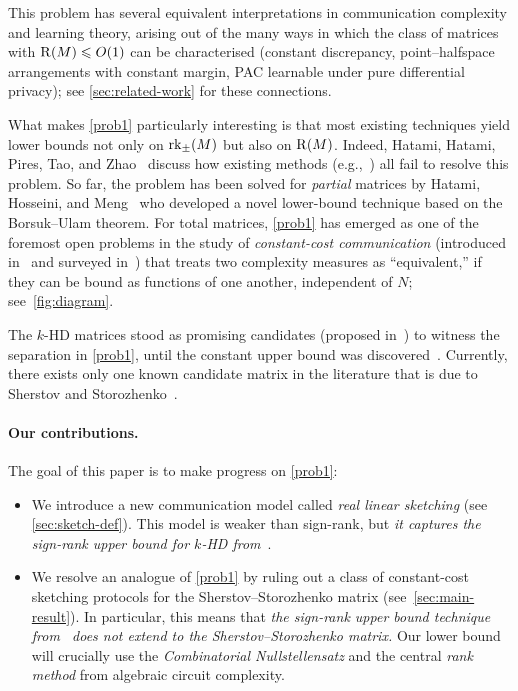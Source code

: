 \documentclass{article}
\begin{document}
This problem has several equivalent interpretations in communication complexity and learning theory, arising out of the many ways in which the class of matrices with $\operatorname{R}(M)\leqslant O(1)$ can be characterised (constant discrepancy, point--halfspace arrangements with constant margin, PAC learnable under pure differential privacy); see \cref{sec:related-work} for these connections.

What makes \cref{prob1} particularly interesting is that most existing techniques yield lower bounds not only on $\operatorname{rk}_\pm(M)$ but also on $\operatorname{R}(M)$. Indeed, Hatami, Hatami, Pires, Tao, and Zhao~\cite{HHPTZ22} discuss how existing methods (e.g.,~\cite{PS86,For02,APP+2005,AMY16}) all fail to resolve this problem. So far, the problem has been solved for \emph{partial} matrices by Hatami, Hosseini, and Meng~\cite{HHM23} who developed a novel lower-bound technique based on the Borsuk--Ulam theorem. For total matrices, \cref{prob1} has emerged as one of the foremost open problems in the study of \emph{constant-cost communication} (introduced in~\cite{HHH23,HWZ22} and surveyed in~\cite{HH24}) that treats two complexity measures as ``equivalent,'' if they can be bound as functions of one another, independent of $N$; see~\cref{fig:diagram}.

The $k$-HD matrices stood as promising candidates (proposed in~\cite{HHPTZ22,HHM23}) to witness the separation in \cref{prob1}, until the constant upper bound was discovered~\cite{GHIS25}. Currently, there exists only one known candidate matrix in the literature that is due to Sherstov and Storozhenko~\cite{SS24}.

\paragraph{Our contributions.} The goal of this paper is to make progress on \cref{prob1}:
\begin{itemize}
    \item We introduce a new communication model called \emph{real linear sketching} (see \cref{sec:sketch-def}). This model is weaker than sign-rank, but \emph{it captures the sign-rank upper bound for \textsc{$k$-HD} from}~\cite{GHIS25}.
    \item We resolve an analogue of \cref{prob1} by ruling out a class of constant-cost sketching protocols for the Sherstov--Storozhenko matrix (see~\cref{sec:main-result}). In particular, this means that \emph{the sign-rank upper bound technique from~{\upshape \cite{GHIS25}} does not extend to the Sherstov--Storozhenko matrix.} Our lower bound will crucially use the \emph{Combinatorial Nullstellensatz} and the central \emph{rank method} from algebraic circuit complexity.
\end{itemize}
\end{document}
